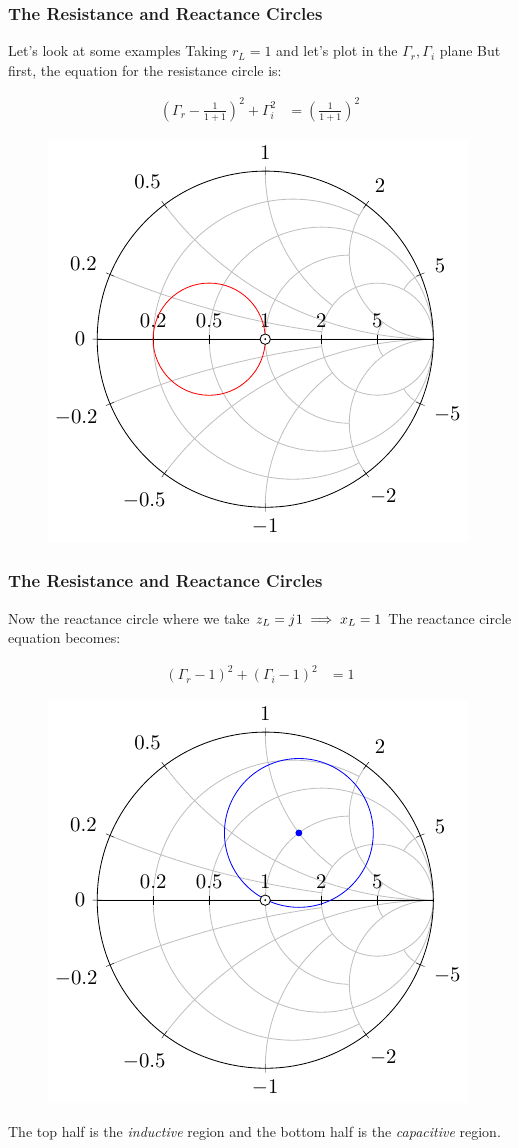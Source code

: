 \documentclass[10pt, compress]{beamer}
\renewcommand{\j}{{j}\mkern1mu} %
\begin{document}
\begin{frame}
    \frametitle{The Resistance and Reactance Circles}
    \begin{outline}
        \1 Let's look at some examples
        \2 Taking $r_L = 1$ and let's plot in the $\Gamma_r ,\Gamma_i$ plane
        \2 But first, the equation for the resistance circle is:
    \end{outline}
    \begin{align*}
        \left(\Gamma_{r} - \frac{1}{1+1}\right)^{2} + \Gamma_{i}^{2} & = \left(\frac{1}{1+1}\right)^{2}
    \end{align*}
    \begin{figure}[h]
        \centering
        \includegraphics[width=.4\textwidth]{smith_resistance.pdf}
    \end{figure}
\end{frame}

\begin{frame}
    \frametitle{The Resistance and Reactance Circles}

    \begin{outline}
        \1 Now the reactance circle where we take $z_L = \j 1 \implies x_L = 1$
        \1 The reactance circle equation becomes:
    \end{outline}
    \begin{align*}
        \left(\Gamma_{r}-1\right)^{2}+\left(\Gamma_{i}-1\right)^{2} & = 1
    \end{align*}
    \begin{figure}[h]
        \centering
        \includegraphics[width=.3\textwidth]{smith_reactance_circle.pdf}
    \end{figure}
    The top half is the \textit{inductive} region and the bottom half is the \textit{capacitive} region.
\end{frame}
\end{document}
